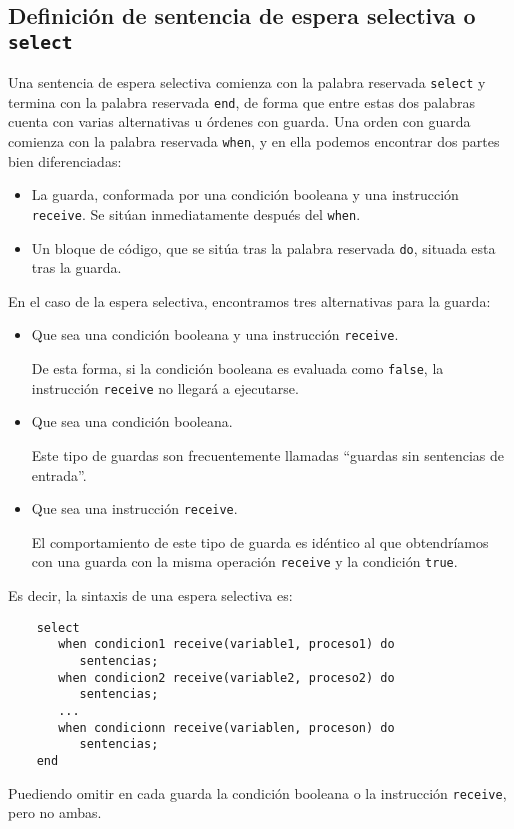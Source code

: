 \subsection{Definición de sentencia de espera selectiva o \texttt{select}}
Una sentencia de espera selectiva comienza con la palabra reservada \verb|select| y termina con la palabra reservada \verb|end|, de forma que entre estas dos palabras cuenta con varias alternativas u órdenes con guarda. Una orden con guarda comienza con la palabra reservada \verb|when|, y en ella podemos encontrar dos partes bien diferenciadas:
\begin{itemize}
    \item La guarda, conformada por una condición booleana y una instrucción \verb|receive|. Se sitúan inmediatamente después del \verb|when|.
    \item Un bloque de código, que se sitúa tras la palabra reservada \verb|do|, situada esta tras la guarda.
\end{itemize}
En el caso de la espera selectiva, encontramos tres alternativas para la guarda:
\begin{itemize}
    \item Que sea una condición booleana y una instrucción \verb|receive|. 

        De esta forma, si la condición booleana es evaluada como \verb|false|, la instrucción \verb|receive| no llegará a ejecutarse.
    \item Que sea una condición booleana.

        Este tipo de guardas son frecuentemente llamadas ``guardas sin sentencias de entrada''.
    \item Que sea una instrucción \verb|receive|. 

    El comportamiento de este tipo de guarda es idéntico al que obtendríamos con una guarda con la misma operación \verb|receive| y la condición \verb|true|.
\end{itemize}
Es decir, la sintaxis de una espera selectiva es:
\begin{verbatim}
    select
       when condicion1 receive(variable1, proceso1) do
          sentencias;
       when condicion2 receive(variable2, proceso2) do
          sentencias;
       ...
       when condicionn receive(variablen, proceson) do
          sentencias;
    end
\end{verbatim}
Puediendo omitir en cada guarda la condición booleana o la instrucción \verb|receive|, pero no ambas.\\

